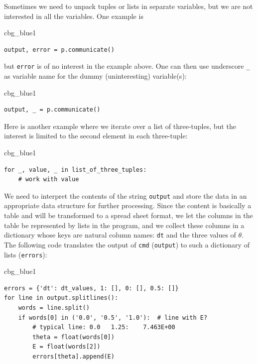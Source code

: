 \documentclass[%
oneside,                 %
final,                   %
10pt]{article}
\newenvironment{_cod_tight}[1]{
   \def\FrameCommand{\colorbox{#1}}
   \FrameRule0.6pt\MakeFramed {\FrameRestore}\vskip3mm}
   {\vskip0mm\endMakeFramed}
\newenvironment{cod}[1]{
\bgroup\rmfamily
\fboxsep=0mm\relax
\begin{_cod_tight}{#1}
\list{}{\parsep=-2mm\parskip=0mm\topsep=0pt\leftmargin=2mm
\rightmargin=2\leftmargin\leftmargin=4pt\relax}
\item\relax}
{\endlist\end{_cod_tight}\egroup}
\newenvironment{notice_mdfboxadmon}[1][]{
\begin{notice_mdfboxmdframed}[frametitle=#1]
}
{
\end{notice_mdfboxmdframed}
}
\begin{document}
\begin{notice_mdfboxadmon}
Sometimes we need to unpack tuples or lists in separate variables,
but we are not interested in all the variables. One example is

\begin{cod}{cbg_blue1}\begin{Verbatim}[numbers=none,fontsize=\fontsize{9pt}{9pt},baselinestretch=0.95,xleftmargin=2mm]
output, error = p.communicate()
\end{Verbatim}
\end{cod}
\noindent
but \texttt{error} is of no interest in the example above.
One can then use underscore \Verb!_! as variable name for the dummy
(uninteresting) variable(s):

\begin{cod}{cbg_blue1}\begin{Verbatim}[numbers=none,fontsize=\fontsize{9pt}{9pt},baselinestretch=0.95,xleftmargin=2mm]
output, _ = p.communicate()
\end{Verbatim}
\end{cod}
\noindent
Here is another example where we iterate over a list of three-tuples,
but the interest is limited to the second element in each three-tuple:

\begin{cod}{cbg_blue1}\begin{Verbatim}[numbers=none,fontsize=\fontsize{9pt}{9pt},baselinestretch=0.95,xleftmargin=2mm]
for _, value, _ in list_of_three_tuples:
    # work with value
\end{Verbatim}
\end{cod}
\noindent
\end{notice_mdfboxadmon}



We need to interpret the contents of the string
\texttt{output} and store
the data in an appropriate data structure for further processing.
Since the content is basically a table and will be transformed to
a spread sheet format, we let the columns in the table be represented
by lists in the program,
and we collect these columns in a dictionary whose keys are natural
column names: \texttt{dt} and the three values of $\theta$.
The following code translates the output of \texttt{cmd} (\texttt{output})
to such a dictionary of lists (\texttt{errors}):

\begin{cod}{cbg_blue1}\begin{Verbatim}[numbers=none,fontsize=\fontsize{9pt}{9pt},baselinestretch=0.95,xleftmargin=2mm]
errors = {'dt': dt_values, 1: [], 0: [], 0.5: []}
for line in output.splitlines():
    words = line.split()
    if words[0] in ('0.0', '0.5', '1.0'):  # line with E?
        # typical line: 0.0   1.25:    7.463E+00
        theta = float(words[0])
        E = float(words[2])
        errors[theta].append(E)
\end{Verbatim}
\end{cod}
\noindent
\end{document}
